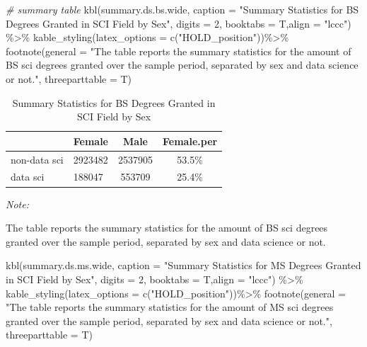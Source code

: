 \documentclass[
  12pt,
]{article}
\newenvironment{Shaded}{\begin{snugshade}}{\end{snugshade}}
\newcommand{\AttributeTok}[1]{\textcolor[rgb]{0.77,0.63,0.00}{#1}}
\newcommand{\CommentTok}[1]{\textcolor[rgb]{0.56,0.35,0.01}{\textit{#1}}}
\newcommand{\DecValTok}[1]{\textcolor[rgb]{0.00,0.00,0.81}{#1}}
\newcommand{\FunctionTok}[1]{\textcolor[rgb]{0.00,0.00,0.00}{#1}}
\newcommand{\NormalTok}[1]{#1}
\newcommand{\SpecialCharTok}[1]{\textcolor[rgb]{0.00,0.00,0.00}{#1}}
\newcommand{\StringTok}[1]{\textcolor[rgb]{0.31,0.60,0.02}{#1}}
\begin{document}
\begin{Shaded}
\begin{Highlighting}[]
\CommentTok{\# summary table}
\FunctionTok{kbl}\NormalTok{(summary.ds.bs.wide, }\AttributeTok{caption =} \StringTok{"Summary Statistics for BS Degrees Granted in SCI Field by Sex"}\NormalTok{, }\AttributeTok{digits =} \DecValTok{2}\NormalTok{, }\AttributeTok{booktabs =}\NormalTok{ T,}\AttributeTok{align =} \StringTok{"lccc"}\NormalTok{) }\SpecialCharTok{\%\textgreater{}\%}
  \FunctionTok{kable\_styling}\NormalTok{(}\AttributeTok{latex\_options =} \FunctionTok{c}\NormalTok{(}\StringTok{"HOLD\_position"}\NormalTok{))}\SpecialCharTok{\%\textgreater{}\%}
   \FunctionTok{footnote}\NormalTok{(}\AttributeTok{general =} \StringTok{"The table reports the summary statistics for the amount of BS sci degrees granted over the sample period, separated by sex and data science or not."}\NormalTok{,}
            \AttributeTok{threeparttable =}\NormalTok{ T)}
\end{Highlighting}
\end{Shaded}

\begin{table}[H]

\caption{\label{tab:unnamed-chunk-12}Summary Statistics for BS Degrees Granted in SCI Field by Sex}
\centering
\begin{threeparttable}
\begin{tabular}[t]{llcc}
\toprule
  & Female & Male & Female.per\\
\midrule
non-data sci & 2923482 & 2537905 & 53.5\%\\
data sci & 188047 & 553709 & 25.4\%\\
\bottomrule
\end{tabular}
\begin{tablenotes}
\item \textit{Note: } 
\item The table reports the summary statistics for the amount of BS sci degrees granted over the sample period, separated by sex and data science or not.
\end{tablenotes}
\end{threeparttable}
\end{table}

\begin{Shaded}
\begin{Highlighting}[]
\FunctionTok{kbl}\NormalTok{(summary.ds.ms.wide, }\AttributeTok{caption =} \StringTok{"Summary Statistics for MS Degrees Granted in SCI Field by Sex"}\NormalTok{, }\AttributeTok{digits =} \DecValTok{2}\NormalTok{, }\AttributeTok{booktabs =}\NormalTok{ T,}\AttributeTok{align =} \StringTok{"lccc"}\NormalTok{) }\SpecialCharTok{\%\textgreater{}\%}
  \FunctionTok{kable\_styling}\NormalTok{(}\AttributeTok{latex\_options =} \FunctionTok{c}\NormalTok{(}\StringTok{"HOLD\_position"}\NormalTok{))}\SpecialCharTok{\%\textgreater{}\%}
   \FunctionTok{footnote}\NormalTok{(}\AttributeTok{general =} \StringTok{"The table reports the summary statistics for the amount of MS sci degrees granted over the sample period, separated by sex and data science or not."}\NormalTok{,}
            \AttributeTok{threeparttable =}\NormalTok{ T)}
\end{Highlighting}
\end{Shaded}
\end{document}

